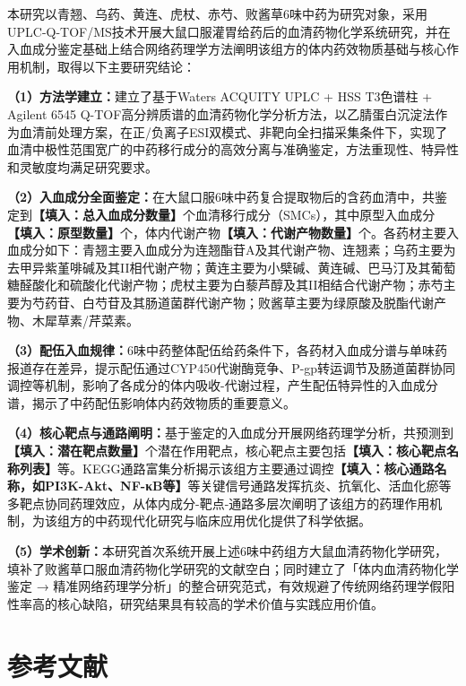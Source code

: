 \documentclass[12pt,a4paper,UTF8,openany]{ctexbook}
\begin{document}
本研究以青翘、乌药、黄连、虎杖、赤芍、败酱草6味中药为研究对象，采用UPLC-Q-TOF/MS技术开展大鼠口服灌胃给药后的血清药物化学系统研究，并在入血成分鉴定基础上结合网络药理学方法阐明该组方的体内药效物质基础与核心作用机制，取得以下主要研究结论：

\textbf{（1）方法学建立：}建立了基于Waters ACQUITY UPLC + HSS T3色谱柱 + Agilent 6545 Q-TOF高分辨质谱的血清药物化学分析方法，以乙腈蛋白沉淀法作为血清前处理方案，在正/负离子ESI双模式、非靶向全扫描采集条件下，实现了血清中极性范围宽广的中药移行成分的高效分离与准确鉴定，方法重现性、特异性和灵敏度均满足研究要求。

\textbf{（2）入血成分全面鉴定：}在大鼠口服6味中药复合提取物后的含药血清中，共鉴定到\textbf{【填入：总入血成分数量】}个血清移行成分（SMCs），其中原型入血成分\textbf{【填入：原型数量】}个，体内代谢产物\textbf{【填入：代谢产物数量】}个。各药材主要入血成分如下：青翘主要入血成分为连翘酯苷A及其代谢产物、连翘素；乌药主要为去甲异紫堇啡碱及其II相代谢产物；黄连主要为小檗碱、黄连碱、巴马汀及其葡萄糖醛酸化和硫酸化代谢产物；虎杖主要为白藜芦醇及其II相结合代谢产物；赤芍主要为芍药苷、白芍苷及其肠道菌群代谢产物；败酱草主要为绿原酸及脱酯代谢产物、木犀草素/芹菜素。

\textbf{（3）配伍入血规律：}6味中药整体配伍给药条件下，各药材入血成分谱与单味药报道存在差异，提示配伍通过CYP450代谢酶竞争、P-gp转运调节及肠道菌群协同调控等机制，影响了各成分的体内吸收-代谢过程，产生配伍特异性的入血成分谱，揭示了中药配伍影响体内药效物质的重要意义。

\textbf{（4）核心靶点与通路阐明：}基于鉴定的入血成分开展网络药理学分析，共预测到\textbf{【填入：潜在靶点数量】}个潜在作用靶点，核心靶点主要包括\textbf{【填入：核心靶点名称列表】}等。KEGG通路富集分析揭示该组方主要通过调控\textbf{【填入：核心通路名称，如PI3K-Akt、NF-κB等】}等关键信号通路发挥抗炎、抗氧化、活血化瘀等多靶点协同药理效应，从体内成分-靶点-通路多层次阐明了该组方的药理作用机制，为该组方的中药现代化研究与临床应用优化提供了科学依据。

\textbf{（5）学术创新：}本研究首次系统开展上述6味中药组方大鼠血清药物化学研究，填补了败酱草口服血清药物化学研究的文献空白；同时建立了「体内血清药物化学鉴定 → 精准网络药理学分析」的整合研究范式，有效规避了传统网络药理学假阳性率高的核心缺陷，研究结果具有较高的学术价值与实践应用价值。

\chapter*{参考文献}
\end{document}
